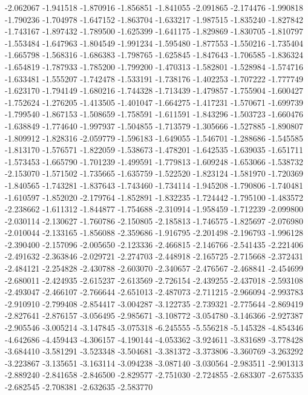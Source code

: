 -2.062067
-1.941518
-1.870916
-1.856851
-1.841055
-2.091865
-2.174476
-1.990818
-1.790236
-1.704978
-1.647152
-1.863704
-1.633217
-1.987515
-1.835240
-1.827842
-1.743167
-1.897432
-1.789500
-1.625399
-1.641175
-1.829869
-1.830705
-1.810797
-1.553484
-1.647963
-1.804549
-1.991234
-1.595480
-1.877553
-1.550216
-1.735404
-1.665798
-1.568316
-1.686383
-1.798765
-1.625845
-1.847643
-1.706585
-1.836324
-1.654819
-1.787933
-1.785200
-1.799200
-1.470313
-1.582801
-1.528984
-1.574716
-1.633481
-1.555207
-1.742478
-1.533191
-1.738176
-1.402253
-1.707222
-1.777749
-1.623170
-1.794149
-1.680216
-1.744328
-1.713439
-1.479857
-1.755904
-1.600427
-1.752624
-1.276205
-1.413505
-1.401047
-1.664275
-1.417231
-1.570671
-1.699739
-1.799540
-1.867153
-1.508659
-1.758591
-1.611591
-1.843296
-1.503723
-1.660476
-1.638849
-1.774640
-1.997937
-1.504855
-1.713579
-1.305666
-1.527885
-1.890807
-1.809912
-1.828316
-2.059779
-1.596183
-1.649055
-1.546701
-1.288686
-1.545585
-1.813170
-1.576571
-1.822059
-1.538673
-1.478201
-1.642535
-1.639035
-1.651711
-1.573453
-1.665790
-1.701239
-1.499591
-1.779813
-1.609248
-1.653066
-1.538732
-2.153070
-1.571502
-1.735665
-1.635759
-1.522520
-1.823124
-1.581970
-1.720369
-1.840565
-1.743281
-1.837643
-1.743460
-1.734114
-1.945208
-1.790806
-1.740481
-1.610597
-1.852020
-2.179764
-1.852891
-1.832235
-1.724442
-1.795100
-1.483572
-2.238662
-1.611312
-1.844877
-1.754688
-2.310914
-1.958459
-1.712239
-2.099800
-2.030114
-2.130627
-1.760786
-2.150805
-2.185813
-1.746575
-1.825697
-2.076980
-2.010044
-2.133165
-1.856088
-2.359686
-1.916795
-2.201498
-2.196793
-1.996128
-2.390400
-2.157096
-2.005650
-2.123336
-2.466815
-2.146766
-2.541435
-2.221406
-2.491632
-2.363846
-2.029721
-2.274703
-2.448918
-2.165725
-2.715668
-2.372431
-2.484121
-2.254828
-2.430788
-2.603070
-2.340657
-2.476567
-2.468841
-2.454699
-2.680011
-2.424935
-2.615237
-2.613569
-2.726154
-2.439255
-2.437018
-2.593108
-2.493047
-2.466107
-2.766644
-2.651013
-2.487073
-2.711215
-2.966094
-2.993783
-2.910910
-2.799408
-2.854417
-3.004287
-3.122735
-2.739321
-2.775644
-2.869419
-2.827641
-2.876157
-3.056495
-2.985671
-3.108772
-3.054780
-3.146366
-2.927387
-2.905546
-3.005214
-3.147845
-3.075318
-6.245555
-5.556218
-5.145328
-4.854346
-4.642686
-4.459443
-4.306157
-4.190144
-4.053362
-3.924611
-3.831689
-3.778428
-3.684410
-3.581291
-3.523348
-3.504681
-3.381372
-3.373806
-3.360769
-3.263292
-3.223867
-3.135651
-3.163114
-3.094238
-3.087140
-3.030564
-2.983511
-2.901313
-2.889240
-2.841658
-2.846500
-2.829577
-2.751030
-2.724855
-2.683307
-2.675335
-2.682545
-2.708381
-2.632635
-2.583770
